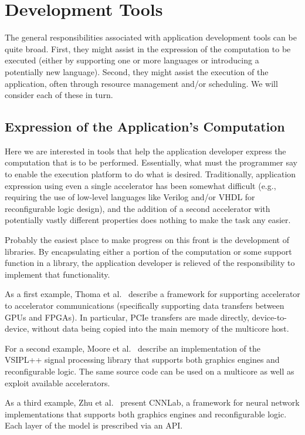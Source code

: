 \section{Development Tools}
\label{sec:dev}

The general responsibilities associated with application development
tools can be quite broad.  First, they might assist in the expression of
the computation to be executed (either by supporting one or more languages
or introducing a potentially new language).  Second, they might assist the
execution of the application, often through resource management and/or
scheduling.  We will consider each of these in turn.

\subsection{Expression of the Application's Computation}

Here we are interested in tools that help the application
developer express the computation that is to be performed. Essentially, what
must the programmer say to enable the execution platform to do what is
desired.  Traditionally, application expression using even a single
accelerator has been somewhat difficult (e.g., requiring the use of
low-level languages like Verilog and/or VHDL for reconfigurable logic
design), and the addition of a second accelerator with potentially vastly
different properties does nothing to make the task any easier.

Probably the easiest place to make progress on this front is the
development of libraries.  By encapsulating either a portion of the
computation or some support function in a library, the application
developer is relieved of the responsibility to implement that functionality.

As a first example, Thoma et al.~\cite{tdmp15} describe a framework for
supporting accelerator to accelerator communications (specifically supporting
data transfers between GPUs and FPGAs).  In particular, PCIe transfers
are made directly, device-to-device, without data being copied into
the main memory of the multicore host. 

For a second example, Moore et al.~\cite{mlk12} describe an implementation
of the VSIPL++ signal processing library that supports both graphics engines
and reconfigurable logic. The same source code can be used on a multicore
as well as exploit available accelerators.

As a third example, Zhu et al.~\cite{zlwx16} present CNNLab, a framework
for neural network implementations that supports both graphics engines
and reconfigurable logic. Each layer of the model is prescribed via an API.

